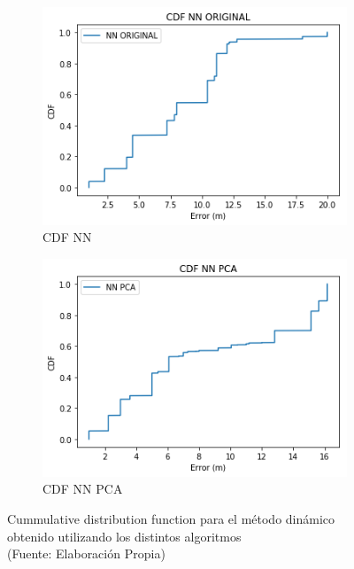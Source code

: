 \begin{figure}[ht!]
\begin{subfigure}{.5\textwidth}
  \centering
  \includegraphics[width=.8\linewidth]{figures/cdf-nn-dinamico.png}
  \caption{CDF NN}
  \label{fig:sub1}
\end{subfigure}%
\begin{subfigure}{.5\textwidth}
  \centering
  \includegraphics[width=.8\linewidth]{figures/cdf-nnPCA-dinamico.png}
  \caption{CDF NN PCA}
  \label{fig:sub2}
\end{subfigure}
\caption[Cummulative distribution function para el método dinámico]{Cummulative distribution function para el método dinámico obtenido utilizando los distintos algoritmos \\
{\scriptsize (Fuente: Elaboración Propia)}}
\label{fig:cdf-dinamicos}
\end{figure}

